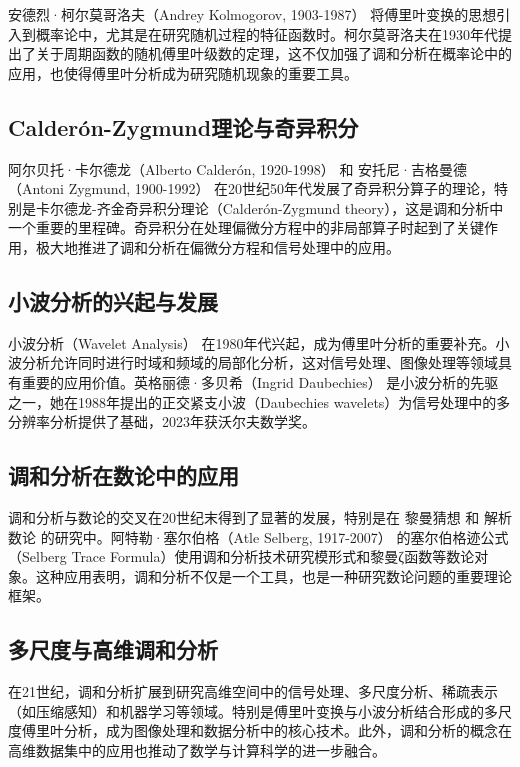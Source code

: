 \documentclass{article}
\begin{document}
安德烈·柯尔莫哥洛夫（Andrey Kolmogorov, 1903-1987） 将傅里叶变换的思想引入到概率论中，尤其是在研究随机过程的特征函数时。柯尔莫哥洛夫在1930年代提出了关于周期函数的随机傅里叶级数的定理，这不仅加强了调和分析在概率论中的应用，也使得傅里叶分析成为研究随机现象的重要工具。


\subsection{Calderón-Zygmund理论与奇异积分}

阿尔贝托·卡尔德龙（Alberto Calderón, 1920-1998） 和 安托尼·吉格曼德（Antoni Zygmund, 1900-1992） 在20世纪50年代发展了奇异积分算子的理论，特别是卡尔德龙-齐金奇异积分理论（Calderón-Zygmund theory），这是调和分析中一个重要的里程碑。奇异积分在处理偏微分方程中的非局部算子时起到了关键作用，极大地推进了调和分析在偏微分方程和信号处理中的应用。

\subsection{小波分析的兴起与发展}

小波分析（Wavelet Analysis） 在1980年代兴起，成为傅里叶分析的重要补充。小波分析允许同时进行时域和频域的局部化分析，这对信号处理、图像处理等领域具有重要的应用价值。英格丽德·多贝希（Ingrid Daubechies） 是小波分析的先驱之一，她在1988年提出的正交紧支小波（Daubechies wavelets）为信号处理中的多分辨率分析提供了基础，2023年获沃尔夫数学奖。


\subsection{调和分析在数论中的应用}

调和分析与数论的交叉在20世纪末得到了显著的发展，特别是在 黎曼猜想 和 解析数论 的研究中。阿特勒·塞尔伯格（Atle Selberg, 1917-2007） 的塞尔伯格迹公式（Selberg Trace Formula）使用调和分析技术研究模形式和黎曼ζ函数等数论对象。这种应用表明，调和分析不仅是一个工具，也是一种研究数论问题的重要理论框架。


\subsection{多尺度与高维调和分析}

在21世纪，调和分析扩展到研究高维空间中的信号处理、多尺度分析、稀疏表示（如压缩感知）和机器学习等领域。特别是傅里叶变换与小波分析结合形成的多尺度傅里叶分析，成为图像处理和数据分析中的核心技术。此外，调和分析的概念在高维数据集中的应用也推动了数学与计算科学的进一步融合。
\end{document}
